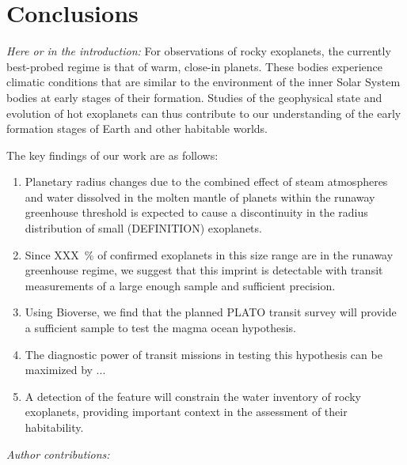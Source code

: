 \documentclass[modern]{aastex631}
\begin{document}
\section{Conclusions}

\begin{note}
    \textit{Here or in the introduction:} For observations of rocky exoplanets, the currently best-probed regime is that of warm, close-in planets.
    These bodies experience climatic conditions that are similar to the environment of the inner Solar System bodies at early stages of their formation.
    Studies of the geophysical state and evolution of hot exoplanets can thus contribute to our understanding of the early formation stages of Earth and other habitable worlds.
\end{note}

The key findings of our work are as follows:
\begin{enumerate}
    \item Planetary radius changes due to the combined effect of steam atmospheres and water dissolved in the molten mantle of planets within the runaway greenhouse threshold is expected to cause a discontinuity in the radius distribution of small (DEFINITION) exoplanets.
    \item Since XXX\SI{}{\percent} of confirmed exoplanets in this size range are in the runaway greenhouse regime, we suggest that this imprint is detectable with transit measurements of a large enough sample and sufficient precision.
    \item Using Bioverse, we find that the planned PLATO transit survey will provide a sufficient sample to test the magma ocean hypothesis.
    \item The diagnostic power of transit missions in testing this hypothesis can be maximized by ...
    \item A detection of the feature will constrain the water inventory of rocky exoplanets, providing important context in the assessment of their habitability.
\end{enumerate}


\begin{large}\textit{Author contributions:}\end{large}
\end{document}
